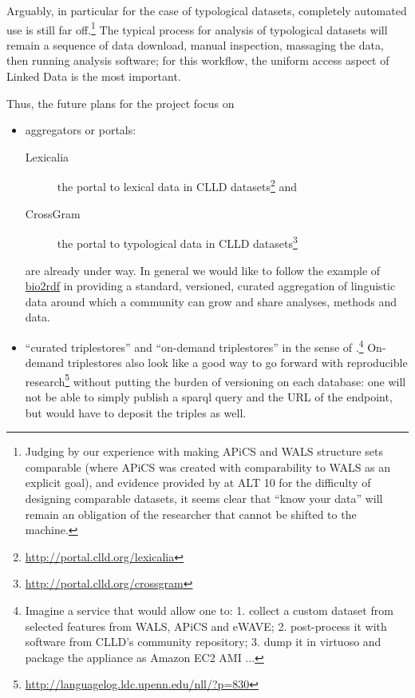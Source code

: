 \documentclass[a4paper,10pt]{article}
\begin{document}
Arguably, in particular for the case of typological datasets, completely automated use is
still far off.\footnote{Judging by our experience with making
APiCS and WALS structure sets comparable (where APiCS was created with comparability to WALS as an explicit goal),
and evidence provided by  at ALT 10 for the difficulty of designing comparable datasets,
it seems clear that ``know your data'' will remain an obligation of the researcher that cannot be shifted to the machine.}
The typical process for analysis of typological datasets will remain a sequence of 
data download, manual inspection, massaging the data, then running analysis software; for this
workflow, the uniform access aspect of Linked Data is the most important.

Thus, the future plans for the project focus on
\begin{itemize}
\item aggregators or portals:
  \begin{description}
  \item[Lexicalia] the portal to lexical data in CLLD datasets\footnote{\url{http://portal.clld.org/lexicalia}} and
  \item[CrossGram] the portal to typological data in CLLD datasets\footnote{\url{http://portal.clld.org/crossgram}}
  \end{description}
  are already under way. In general we would like to follow the example of \href{http://bio2rdf.org}{bio2rdf}
  in providing a standard, versioned, curated aggregation of linguistic data around which a
  community can grow and share analyses, methods and data.
\item ``curated triplestores'' and ``on-demand triplestores'' in the sense of .\footnote{Imagine a service that would allow one to:
1. collect a custom dataset from selected features from WALS, APiCS and eWAVE;
2. post-process it with software from CLLD's community repository;
3. dump it in virtuoso and package the appliance as Amazon EC2 AMI ...
}
  On-demand triplestores also look like a good way to go forward with reproducible research\footnote{\url{http://languagelog.ldc.upenn.edu/nll/?p=830}}
  without putting the burden of versioning on each database:
  one will not be able to simply publish a sparql query and the URL of the endpoint, but would have to deposit the triples as well.
\end{itemize}



\end{document}
